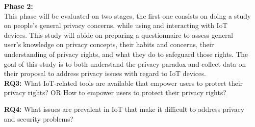 \documentclass[conference]{IEEEtran}
\begin{document}
\textbf{Phase 2:} \\

This phase will be evaluated on two stages, the first one consists
on doing a study on people's general privacy concerns, while using and interacting
with IoT devices. This study will abide on preparing a questionnaire to assess
general user's knowledge on privacy concepts, their habits and concerns, their
understanding of privacy rights, and what they do to safeguard those rights.
The goal of this study is to both understand the privacy
paradox and collect data on their proposal to address privacy issues with regard
to IoT devices. \\

\textbf{RQ3:} What IoT-related tools are available that empower users to
protect their privacy rights? OR How to empower users to protect their privacy
rights?

\textbf{RQ4:} What issues are prevalent in IoT that make it difficult to
address privacy and security problems?





\end{document}
